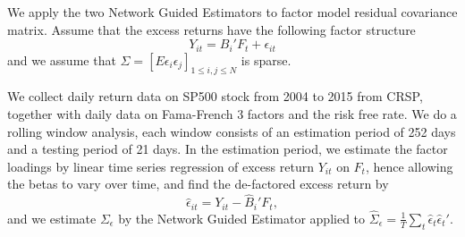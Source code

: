 We apply the two Network Guided Estimators to factor model residual covariance matrix. Assume that the excess returns have the following factor structure
\begin{equation*}
    Y_{it} = B_{i}'F_{t} + \epsilon_{it}
\end{equation*}
and we assume that \(\Sigma = [E \epsilon_{i} \epsilon_{j}]_{1 \leq i,j\leq N}\) is sparse.

We collect daily return data on SP500 stock from 2004 to 2015 from CRSP, together with daily data on Fama-French 3 factors and the risk free rate.  We do a rolling window analysis, each window consists of an estimation period of 252 days and a testing period of 21 days. In the estimation period, we estimate the factor loadings by linear time series regression of excess return \(Y_{it}\) on \(F_{t}\), hence allowing the betas to vary over time, and find the de-factored excess return by 
\begin{equation*}
    \hat{\epsilon}_{it} = Y_{it} - \hat{B}_{i}'F_{t},
\end{equation*}
and we estimate \(\Sigma_{\epsilon}\) by the Network Guided Estimator applied to \(\hat{\Sigma}_{\epsilon} = \frac{1}{T} \sum_{t}\hat{\epsilon}_{t} \hat{\epsilon}_{t}'\).


